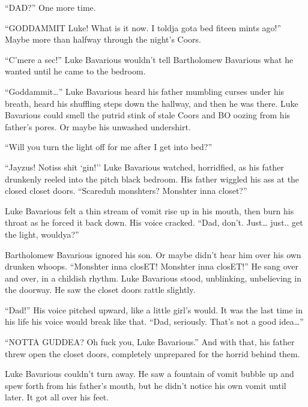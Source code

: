 ``DAD?'' One more time.



``GODDAMMIT Luke! What is it now. I toldja gota bed fiteen
mints ago!'' Maybe more than halfway through the night's
Coors.



``C'mere a sec!'' Luke Bavarious wouldn't
tell Bartholomew Bavarious what he wanted until he came to the
bedroom.



``Goddammit{\ldots}'' Luke Bavarious heard his father
mumbling curses under his breath, heard his shuffling steps down
the hallway, and then he was there. Luke Bavarious could smell the
putrid stink of stale Coors and BO oozing from his father's pores.
Or maybe his unwashed undershirt.



``Will you turn the light off for me after I get into
bed?''



``Jayzus! Notiss shit `gin!'' Luke Bavarious
watched, horridfied, as his father drunkenly reeled into the pitch
black bedroom. His father wiggled his ass at the closed closet
doors. ``Scareduh monshters? Monshter inna
closet?''



Luke Bavarious felt a thin stream of vomit rise up in his mouth,
then burn his throat as he forced it back down. His voice cracked.
``Dad, don't. Just{\ldots} just.. get the light,
wouldya?''



Bartholomew Bavarious ignored his son. Or maybe didn't hear
him over his own drunken whoops. ``Monshter inna closET!
Monshter inna closET!'' He sang over and over, in a childish
rhythm. Luke Bavarious stood, unblinking, unbelieving in the
doorway. He saw the closet doors rattle slightly.



``Dad!'' His voice pitched upward, like a little
girl's would. It was the last time in his life his voice
would break like that. ``Dad, seriously. That's not a
good idea{\ldots}''



``NOTTA GUDDEA? Oh fuck you, Luke Bavarious.'' And with
that, his father threw open the closet doors, completely unprepared
for the horrid behind them.



Luke Bavarious couldn't turn away. He saw a fountain of vomit
bubble up and spew forth from his father's mouth, but he
didn't notice his own vomit until later. It got all over his
feet.



